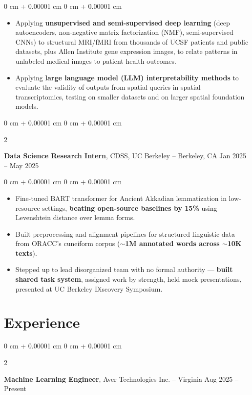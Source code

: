 \documentclass[10pt, letterpaper]{article}
\newenvironment{highlights}{
    \begin{itemize}[
        topsep=0.3 cm,
        parsep=0.05 cm,
        partopsep=0pt,
        itemsep=0.02 cm,
        leftmargin=0 cm + 10pt
    ]
}{
    \end{itemize}
} %
\newenvironment{onecolentry}{
    \begin{adjustwidth}{
        0 cm + 0.00001 cm
    }{
        0 cm + 0.00001 cm
    }
}{
    \end{adjustwidth}
} %
\newenvironment{twocolentry}[2][]{
    \onecolentry
    \def\secondColumn{#2}
    \setcolumnwidth{\fill, 4.5 cm}
    \begin{paracol}{2}
}{
    \switchcolumn \raggedleft \secondColumn
    \end{paracol}
    \endonecolentry
} %
\begin{document}
        \vspace{0.10 cm}
        \begin{onecolentry}
            \begin{highlights}
                \item Applying \textbf{unsupervised and semi-supervised deep learning} (deep autoencoders, non-negative matrix factorization (NMF), semi-supervised CNNs) to structural MRI/fMRI from thousands of UCSF patients and public datasets, plus Allen Institute gene expression images, to relate patterns in unlabeled medical images to patient health outcomes.
                \item Applying \textbf{large language model (LLM) interpretability methods} to evaluate the validity of outputs from spatial queries in spatial transcriptomics, testing on smaller datasets and on larger spatial foundation models.
            \end{highlights}
        \end{onecolentry}

        \vspace{0.10 cm}

        \begin{twocolentry}{
            Jan 2025 – May 2025
        }
            \textbf{Data Science Research Intern}, CDSS, UC Berkeley -- Berkeley, CA\end{twocolentry}

        \vspace{0.10 cm}
        \begin{onecolentry}
            \begin{highlights}
                \item Fine-tuned BART transformer for Ancient Akkadian lemmatization in low-resource settings, \textbf{beating open-source baselines by 15\%} using Levenshtein distance over lemma forms.
                \item Built preprocessing and alignment pipelines for structured linguistic data from ORACC's cuneiform corpus (\textbf{$\sim$1M annotated words across $\sim$10K texts}).
                \item Stepped up to lead disorganized team with no formal authority — \textbf{built shared task system}, assigned work by strength, held mock presentations, presented at UC Berkeley Discovery Symposium.
            \end{highlights}
        \end{onecolentry}

    \section{Experience}
        \begin{twocolentry}{
            Aug 2025 – Present
        }
            \textbf{Machine Learning Engineer}, Aver Technologies Inc. -- Virginia\end{twocolentry}
\end{document}
